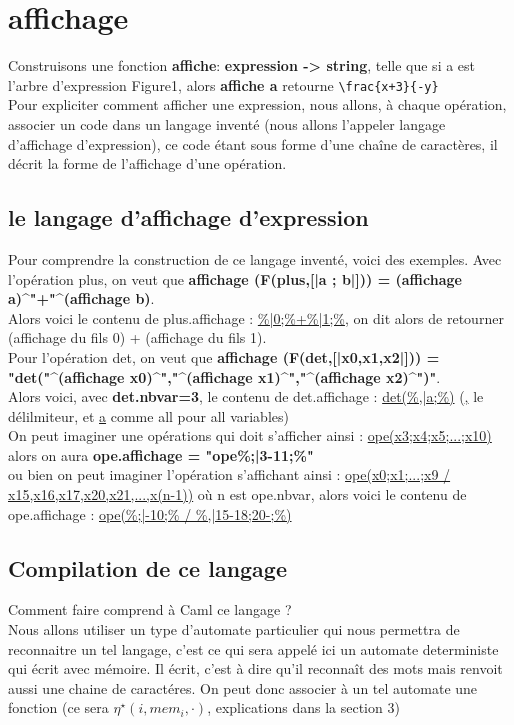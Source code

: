 \documentclass{article}
\theoremstyle{definition}
\begin{document}
\section{affichage}
Construisons une fonction \textbf{affiche}: \textbf{expression -> string}, telle que si a est l'arbre d'expression Figure1, alors \textbf{affiche a} retourne \verb|\frac{x+3}{-y}|\\
Pour expliciter comment afficher une expression, nous allons, \`a chaque op\'eration, associer un code dans un langage invent\'e (nous allons l'appeler langage d'affichage d'expression), ce code \'etant sous forme d'une cha\^ine de caract\`eres, il d\'ecrit la forme de l'affichage d'une op\'eration.

\subsection{le langage d'affichage d'expression}
Pour comprendre la construction de ce langage invent\'e, voici des exemples.
Avec l'op\'eration plus, on veut que \textbf{affichage (F(plus,[|a ; b|])) = (affichage a)\^{}"+"\^{}(affichage b)}.\\ 
Alors voici le contenu de plus.affichage : \underline{\%|0;\%+\%|1;\%}, on dit alors de retourner (affichage du fils 0) + (affichage du fils 1).\\

Pour l'op\'eration det, on veut que \textbf{affichage (F(det,[|x0,x1,x2|])) = "det("\^{}(affichage x0)\^{}","\^{}(affichage x1)\^{}","\^{}(affichage x2)\^{}")"}.\\
Alors voici, avec \textbf{det.nbvar=3}, le contenu de det.affichage : \underline{det(\%,|a;\%)} (\underline{,} le d\'elilmiteur, et \underline{a} comme all pour all variables)\\

On peut imaginer une op\'erations qui doit s'afficher ainsi : \underline{ope(x3;x4;x5;...;x10)} alors on aura \textbf{ope.affichage = "ope\%;|3-11;\%"}\\
ou bien on peut imaginer l'op\'eration s'affichant ainsi : \underline{ope(x0;x1;...;x9 / x15,x16,x17,x20,x21,...,x(n-1))} o\`u n est ope.nbvar, alors voici le contenu de ope.affichage : \underline{ope(\%;|-10;\% / \%,|15-18;20-;\%)}

\subsection{Compilation de ce langage}
Comment faire comprend \`a Caml ce langage ?\\
Nous allons utiliser un type d'automate particulier qui nous permettra de reconnaitre un tel langage, 
c'est ce qui sera appel\'e ici un automate deterministe qui \'ecrit avec m\'emoire. Il \'ecrit, 
c'est \`a dire qu'il reconna\^it des mots mais renvoit aussi une chaine de caract\'eres. 
On peut donc associer \`a un tel automate une fonction (ce sera $\eta^\star(i,mem_i,\cdot)$, explications dans la section 3)\\
\end{document}
